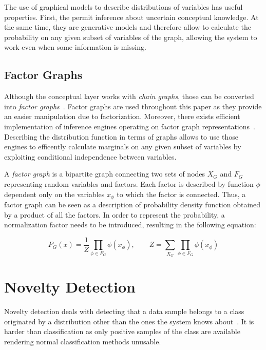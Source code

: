 \documentclass[runningheads,a4paper]{llncs}
\begin{document}
The use of graphical models to describe distributions of variables has useful properties.
First, the permit inference about uncertain conceptual knowledge. At the same time, they are 
generative models and therefore allow to calculate the probability
on any given subset of variables of the graph, allowing the system to work even when some
information is missing.


\subsection{Factor Graphs}
Although the conceptual layer works with \emph{chain graphs}, those can be converted
into \emph{factor graphs}~\cite{kschischang2001factor}. Factor graphs are used throughout this paper as they provide an
easier manipulation due to factorization.
Moreover, there exists efficient implementation of inference engines operating on factor graph
representations~\cite{Mooij_libDAI_10}.
Describing the distribution function in terms of graphs allows to use those engines to
efficently calculate marginals on any given subset of variables by exploiting conditional
independence between variables.

A \emph{factor graph} is a bipartite graph connecting two sets of nodes $X_G$ and $F_G$
representing random variables and factors.
Each factor is described by function $\phi$ dependent only on the variables $x_\phi$
to which the factor is connected.
Thus, a factor graph can be seen as a description of probability density function obtained
by a product of all the factors. In order to represent the probability,
a normalization factor needs to be introduced, resulting in the following equation:

\begin{equation}
P_G(x) = \frac{1}{Z}\prod_{\phi \in F_G}{\phi(x_{\phi})},\qquad
Z = \sum_{X_G}\prod_{\phi \in F_G}{\phi(x_{\phi})}
\end{equation}


\section{Novelty Detection}
\label{sec:novelty-detection}
Novelty detection deals with detecting that a data sample belongs to a class
originated by a distribution other than the ones the system knows about~\cite{markou2003novelty}.
It is harder than classification as only positive samples of the class are available
rendering normal classification methods unusable.
\end{document}
